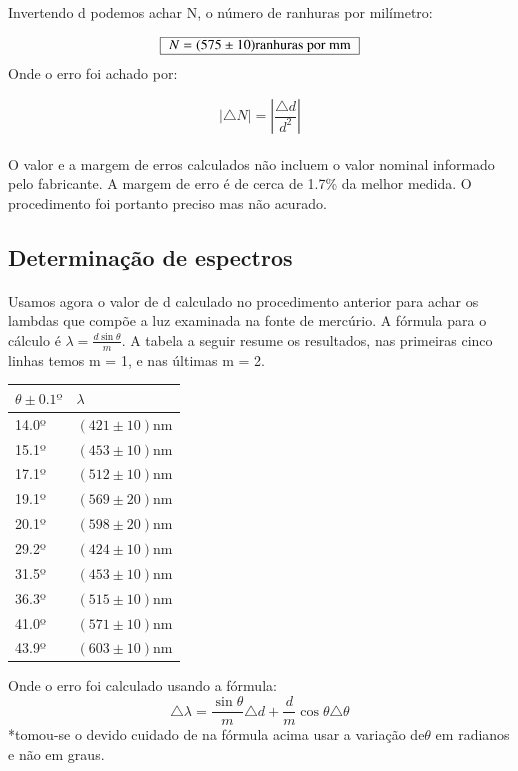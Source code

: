 \documentclass[a4paper,11pt]{article}
\newcommand{\MyBox}[1]
{
	\begin{tabular}{|l|}\hline
	  #1 \\ \hline	    
	\end{tabular} 	
}
\begin{document}
Invertendo d podemos achar N, o número de ranhuras por milímetro:

\begin{equation}
\MyBox{	$N = (575 \pm 10)\mbox{ranhuras por mm}$}
\end{equation}
Onde o erro foi achado por:

\begin{equation}
	|\triangle N| = |\frac{\triangle d}{d^2}|
\end{equation}

\paragraph{} O valor e a margem de erros calculados não incluem o valor nominal
informado pelo fabricante. A margem de erro é de cerca de 1.7\% da melhor
medida. O procedimento foi portanto preciso mas não acurado.

\subsection{Determinação de espectros}
\paragraph{}Usamos agora o valor de d calculado no procedimento anterior
para achar os lambdas que compõe a luz examinada na fonte de mercúrio. A fórmula
para o cálculo é $\lambda = \frac{d \sin \theta}{m}$. A tabela a seguir
resume os resultados, nas primeiras cinco linhas temos m = 1, e nas últimas
m = 2.
\FloatBarrier
\begin{table}[!htp]
\centering
\begin{tabular}{|l|l|}\hline
	$\theta \pm 0.1º$  & $\lambda$  \\ \hline
         14.0º	 &$( 421 \pm 10 )$nm \\ \hline
	 15.1º & $( 453 \pm 10 )$nm \\ \hline
	 17.1º & $( 512 \pm 10 )$nm \\ \hline
 	 19.1º & $( 569 \pm 20 )$nm \\ \hline
	 20.1º & $( 598 \pm 20 )$nm \\ \hline
	 29.2º & $( 424 \pm 10 )$nm \\ \hline
	 31.5º & $( 453 \pm 10 )$nm \\ \hline
	 36.3º & $( 515 \pm 10 )$nm \\ \hline
	 41.0º & $( 571 \pm 10 )$nm \\ \hline
	 43.9º & $( 603 \pm 10 )$nm \\ \hline
\end{tabular}
\end{table}
\FloatBarrier
Onde o erro foi calculado usando a fórmula:
\begin{equation}
	\triangle \lambda =
 \frac{\sin \theta}{m} \triangle d + \frac{d}{m} \cos \theta \triangle \theta
\end{equation}
*tomou-se o devido cuidado de na fórmula acima usar a variação de$\theta$ em 
radianos e não em graus.
\end{document}
